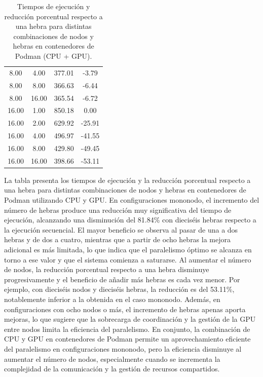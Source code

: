 \begin{table}[ht]
\begin{tabular}{|c|c|c|c|}
        8.00           & 4.00            & 377.01              & -3.79                          \\
        8.00           & 8.00            & 366.63              & -6.44                          \\
        8.00           & 16.00           & 365.54              & -6.72                          \\
        16.00          & 1.00            & 850.18              & 0.00                           \\
        16.00          & 2.00            & 629.92              & -25.91                         \\
        16.00          & 4.00            & 496.97              & -41.55                         \\
        16.00          & 8.00            & 429.80              & -49.45                         \\
        16.00          & 16.00           & 398.66              & -53.11                         \\
        \hline
    \end{tabular}
    \caption{Tiempos de ejecución y reducción porcentual respecto a una hebra para distintas combinaciones de nodos y hebras en contenedores de Podman (CPU + GPU).}
    \label{tab:thread_sweep_ubuntu_podman_gpu_time}
\end{table}

La tabla presenta los tiempos de ejecución y la reducción porcentual respecto a una hebra para distintas combinaciones de nodos y hebras en contenedores de Podman utilizando CPU y GPU. En configuraciones mononodo, el incremento del número de hebras produce una reducción muy significativa del tiempo de ejecución, alcanzando una disminución del 81.84\% con dieciséis hebras respecto a la ejecución secuencial. El mayor beneficio se observa al pasar de una a dos hebras y de dos a cuatro, mientras que a partir de ocho hebras la mejora adicional es más limitada, lo que indica que el paralelismo óptimo se alcanza en torno a ese valor y que el sistema comienza a saturarse. Al aumentar el número de nodos, la reducción porcentual respecto a una hebra disminuye progresivamente y el beneficio de añadir más hebras es cada vez menor. Por ejemplo, con dieciséis nodos y dieciséis hebras, la reducción es del 53.11\%, notablemente inferior a la obtenida en el caso mononodo. Además, en configuraciones con ocho nodos o más, el incremento de hebras apenas aporta mejoras, lo que sugiere que la sobrecarga de coordinación y la gestión de la GPU entre nodos limita la eficiencia del paralelismo. En conjunto, la combinación de CPU y GPU en contenedores de Podman permite un aprovechamiento eficiente del paralelismo en configuraciones mononodo, pero la eficiencia disminuye al aumentar el número de nodos, especialmente cuando se incrementa la complejidad de la comunicación y la gestión de recursos compartidos.

